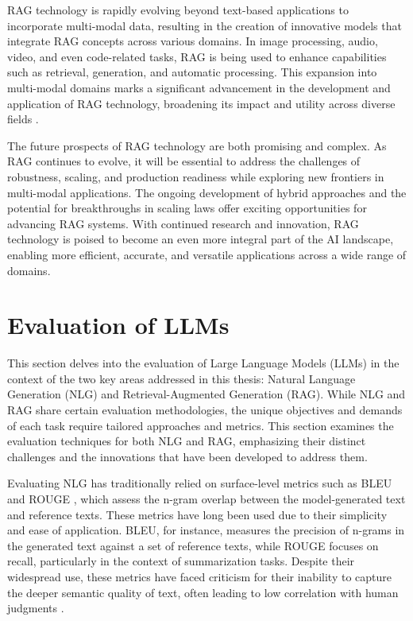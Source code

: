 RAG technology is rapidly evolving beyond text-based applications to incorporate multi-modal data, resulting in the creation of innovative models that integrate RAG concepts across various domains. In image processing, audio, video, and even code-related tasks, RAG is being used to enhance capabilities such as retrieval, generation, and automatic processing. This expansion into multi-modal domains marks a significant advancement in the development and application of RAG technology, broadening its impact and utility across diverse fields \cite{gao2023retrieval}.

\newline

The future prospects of RAG technology are both promising and complex. As RAG continues to evolve, it will be essential to address the challenges of robustness, scaling, and production readiness while exploring new frontiers in multi-modal applications. The ongoing development of hybrid approaches and the potential for breakthroughs in scaling laws offer exciting opportunities for advancing RAG systems. With continued research and innovation, RAG technology is poised to become an even more integral part of the AI landscape, enabling more efficient, accurate, and versatile applications across a wide range of domains.

\section{Evaluation of LLMs}


This section delves into the evaluation of Large Language Models (LLMs) in the context of the two key areas addressed in this thesis: Natural Language Generation (NLG) and Retrieval-Augmented Generation (RAG). While NLG and RAG share certain evaluation methodologies, the unique objectives and demands of each task require tailored approaches and metrics. This section examines the evaluation techniques for both NLG and RAG, emphasizing their distinct challenges and the innovations that have been developed to address them.

Evaluating NLG has traditionally relied on surface-level metrics such as BLEU \cite{papineni2002bleu} and ROUGE \cite{lin2004rouge}, which assess the n-gram overlap between the model-generated text and reference texts. These metrics have long been used due to their simplicity and ease of application. BLEU, for instance, measures the precision of n-grams in the generated text against a set of reference texts, while ROUGE focuses on recall, particularly in the context of summarization tasks. Despite their widespread use, these metrics have faced criticism for their inability to capture the deeper semantic quality of text, often leading to low correlation with human judgments \cite{sulem2018bleu}.

